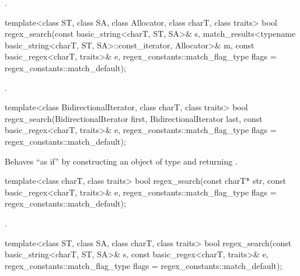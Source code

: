 \begin{itemdescr}
\pnum
\returns {}.
\end{itemdescr}

%
\begin{itemdecl}
template<class ST, class SA, class Allocator, class charT, class traits>
  bool regex_search(const basic_string<charT, ST, SA>& s,
                    match_results<typename basic_string<charT, ST, SA>::const_iterator,
                                  Allocator>& m,
                    const basic_regex<charT, traits>& e,
                    regex_constants::match_flag_type flags = regex_constants::match_default);
\end{itemdecl}

\begin{itemdescr}
\pnum
\returns {}.
\end{itemdescr}

%
\begin{itemdecl}
template<class BidirectionalIterator, class charT, class traits>
  bool regex_search(BidirectionalIterator first, BidirectionalIterator last,
                    const basic_regex<charT, traits>& e,
                    regex_constants::match_flag_type flags = regex_constants::match_default);
\end{itemdecl}

\begin{itemdescr}
\pnum
\effects Behaves ``as if'' by constructing an object 
of type  and returning
.
\end{itemdescr}

%
\begin{itemdecl}
template<class charT, class traits>
  bool regex_search(const charT* str,
                    const basic_regex<charT, traits>& e,
                    regex_constants::match_flag_type flags = regex_constants::match_default);
\end{itemdecl}

\begin{itemdescr}
\pnum
\returns {}.
\end{itemdescr}

%
\begin{itemdecl}
template<class ST, class SA, class charT, class traits>
  bool regex_search(const basic_string<charT, ST, SA>& s,
                    const basic_regex<charT, traits>& e,
                    regex_constants::match_flag_type flags = regex_constants::match_default);
\end{itemdecl}


